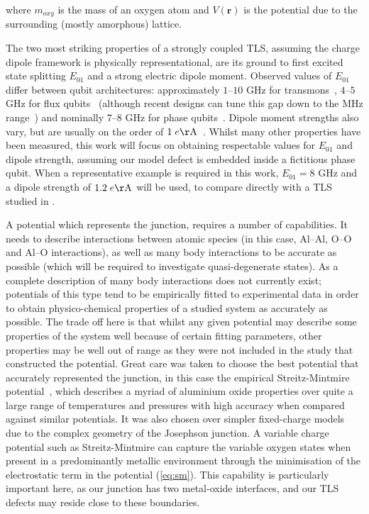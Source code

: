 where $m_{oxy}$ is the mass of an oxygen atom and $V(\mathbf{r})$ is the potential due to the surrounding (mostly amorphous) lattice.

The two most striking properties of a strongly coupled TLS, assuming the charge dipole framework is physically representational, are its ground to first excited state splitting $E_{01}$ and a strong electric dipole moment.
Observed values of $E_{01}$  differ between qubit architectures: approximately $1$--$10$ GHz for transmons~\cite{Koch2007}, $4$--$5$ GHz for flux qubits~\cite{Lupascu2009} (although recent designs can tune this gap down to the MHz range~\cite{Schwarz2013}) and nominally $7$--$8$ GHz for phase qubits~\cite{Cole2010}.
Dipole moment strengths also vary, but are usually on the order of $1 \; e\mathrm{\AA}$~\cite{Cole2010,Shalibo2010}.
Whilst many other properties have been measured, this work will focus on obtaining respectable values for $E_{01}$ and dipole strength, assuming our model defect is embedded inside a fictitious phase qubit.
When a representative example is required in this work, $E_{01}=8$ GHz and a dipole strength of $1.2 \; e\mathrm{\AA}$ will be used, to compare directly with a TLS studied in .

A potential which represents the junction, requires a number of capabilities.
It needs to describe interactions between atomic species (in this case, Al--Al, O--O and Al--O interactions), as well as many body interactions to be accurate as possible (which will be required to investigate quasi-degenerate states).
As a complete description of many body interactions does not currently exist; potentials of this type tend to be empirically fitted to experimental data in order to obtain physico-chemical properties of a studied system as accurately as possible.
The trade off here is that whilst any given potential may describe some properties of the system well because of certain fitting parameters, other properties may be well out of range as they were not included in the study that constructed the potential.
Great care was taken to choose the best potential that accurately represented the junction, in this case the empirical Streitz-Mintmire potential~\cite{Streitz1994}, which describes a myriad of aluminium oxide properties over quite a large range of temperatures and pressures with high accuracy when compared against similar potentials.
It was also chosen over simpler fixed-charge models~\cite{Catlow1982,Dienes1975} due to the complex geometry of the Josephson junction. A variable charge potential such as Streitz-Mintmire can capture the variable oxygen states when present in a predominantly metallic environment through the minimisation of the electrostatic term in the potential (\cref{eq:sm}).
This capability is particularly important here, as our junction has two metal-oxide interfaces, and our TLS defects may reside close to these boundaries.

